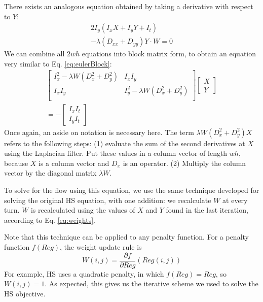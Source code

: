 \documentclass[10pt,twocolumn,letterpaper]{article}
\begin{document}
There exists an analogous equation obtained by taking a derivative with respect to $Y$:
\begin{equation} \label{eq:leastsqy}
\begin{aligned}
2I_y (I_x X + I_y Y + I_t) \\
 -\lambda(D_{xx} + D_{yy}) Y \cdot W = 0
\end{aligned}
\end{equation} 
We can combine all $2wh$ equations into block matrix form, to obtain an equation very similar to Eq. \ref{eq:eulerBlock}:
\begin{multline} \label{eq:leastsqBlock}
\left[ \begin{array}{cc}
I_x^2 - \lambda W (D_x^2 + D_y^2) & I_x I_y\\
I_x I_y & I_y^2 - \lambda W (D_x^2 + D_y^2) \\
\end{array} \right]
\left[\begin{array}{c}
X \\
Y
\end{array} \right] \\
=-\left[ \begin{array}{c}
I_x I_t \\
I_y I_t
\end{array} \right]
\end{multline}
Once again, an aside on notation is necessary here.  The term $\lambda W (D_x^2 + D_y^2) X$ refers to the following steps: (1) evaluate the sum of the second derivatives at $X$ using the Laplacian filter.  Put these values in a column vector of length $wh$, because $X$ is a column vector and $D_x$ is an operator.  (2) Multiply the column vector by the diagonal matrix $\lambda W$.

To solve for the flow using this equation, we use the same technique developed for solving the original HS equation, with one addition: we recalculate $W$ at every turn.  $W$ is recalculated using the values of $X$ and $Y$ found in the last iteration, according to Eq. \ref{eq:weights}.

Note that this technique can be applied to any penalty function.  For a penalty function $f(Reg)$, the weight update rule is 
\begin{equation} \label{eq:genericpenalty}
W(i, j) = \frac{\partial f}{\partial Reg} (Reg(i, j))
\end{equation}
For example, HS uses a quadratic penalty, in which $f(Reg) = Reg$, so $W(i, j) = 1$.  As expected, this gives us the iterative scheme we used to solve the HS objective.
\end{document}
